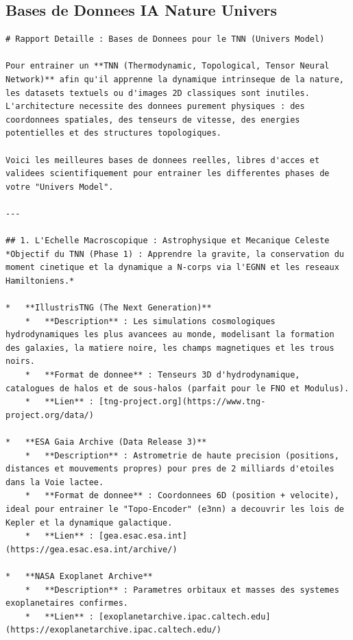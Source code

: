 \documentclass[11pt,a4paper]{article}
\begin{document}
\subsection{Bases de Donnees IA Nature Univers}
\begin{lstlisting}[language={}, caption={}, basicstyle=\ttfamily\footnotesize, breaklines=true]
# Rapport Detaille : Bases de Donnees pour le TNN (Univers Model)

Pour entrainer un **TNN (Thermodynamic, Topological, Tensor Neural Network)** afin qu'il apprenne la dynamique intrinseque de la nature, les datasets textuels ou d'images 2D classiques sont inutiles. L'architecture necessite des donnees purement physiques : des coordonnees spatiales, des tenseurs de vitesse, des energies potentielles et des structures topologiques.

Voici les meilleures bases de donnees reelles, libres d'acces et validees scientifiquement pour entrainer les differentes phases de votre "Univers Model".

---

## 1. L'Echelle Macroscopique : Astrophysique et Mecanique Celeste
*Objectif du TNN (Phase 1) : Apprendre la gravite, la conservation du moment cinetique et la dynamique a N-corps via l'EGNN et les reseaux Hamiltoniens.*

*   **IllustrisTNG (The Next Generation)**
    *   **Description** : Les simulations cosmologiques hydrodynamiques les plus avancees au monde, modelisant la formation des galaxies, la matiere noire, les champs magnetiques et les trous noirs.
    *   **Format de donnee** : Tenseurs 3D d'hydrodynamique, catalogues de halos et de sous-halos (parfait pour le FNO et Modulus).
    *   **Lien** : [tng-project.org](https://www.tng-project.org/data/)

*   **ESA Gaia Archive (Data Release 3)**
    *   **Description** : Astrometrie de haute precision (positions, distances et mouvements propres) pour pres de 2 milliards d'etoiles dans la Voie lactee.
    *   **Format de donnee** : Coordonnees 6D (position + velocite), ideal pour entrainer le "Topo-Encoder" (e3nn) a decouvrir les lois de Kepler et la dynamique galactique.
    *   **Lien** : [gea.esac.esa.int](https://gea.esac.esa.int/archive/)

*   **NASA Exoplanet Archive**
    *   **Description** : Parametres orbitaux et masses des systemes exoplanetaires confirmes.
    *   **Lien** : [exoplanetarchive.ipac.caltech.edu](https://exoplanetarchive.ipac.caltech.edu/)


\end{lstlisting}
\end{document}
